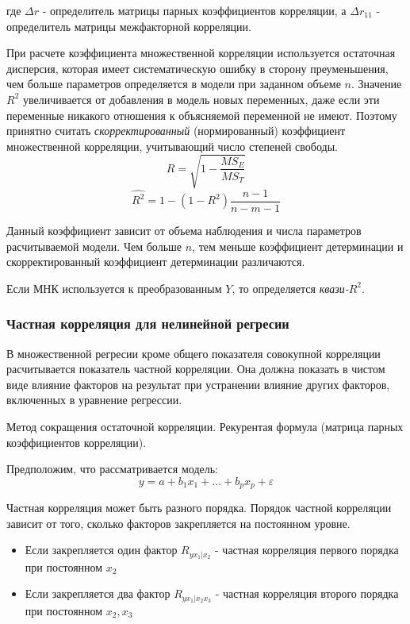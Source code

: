 \documentclass[aps,%
12pt,%
final,%
oneside,
onecolumn,%
musixtex, %
superscriptaddress,%
centertags]{article} %
\begin{document}
где $\Delta r$ - определитель матрицы парных коэффициентов корреляции, а
$\Delta r_{11}$ - определитель матрицы межфакторной корреляции.

При расчете коэффициента множественной корреляции используется остаточная дисперсия, которая имеет систематическую ошибку в сторону преуменьшения, чем больше параметров определяется в модели при заданном объеме $n$. Значение $R^2$ увеличивается от добавления в модель новых переменных, даже если эти переменные никакого отношения к объясняемой переменной не имеют. Поэтому принятно считать \textit{скорректированный} (нормированный) коэффициент множественной корреляции, учитывающий число степеней свободы.
$$ R = \sqrt{1 - \frac{MS_E}{MS_T}}$$
$$ \hat{R^2} = 1 -(1-R^2) \frac{n-1}{n-m-1}$$

Данный коэффициент зависит от объема наблюдения и числа параметров расчитываемой модели. Чем больше $n$, тем меньше коэффициент детерминации и скорректированный коэффициент детерминации различаются.

Если МНК используется к преобразованным $Y$, то определяется \textit{квази-$R^2$}.

\subsubsection{Частная корреляция для нелинейной регресии}

В множественной регресии кроме общего показателя совокупной корреляции расчитывается показатель частной корреляции. Она должна показать в чистом виде влияние факторов на результат при устранении влияние других факторов, включенных в уравнение регрессии.

Метод сокращения остаточной корреляции.
Рекурентая формула (матрица парных коэффициентов корреляции).

Предположим, что рассматривается модель:
$$y=a +b_1x_1 + \ldots + b_px_p + \varepsilon $$

Частная корреляция может быть разного порядка. Порядок частной корреляции зависит от того, сколько факторов закрепляется на постоянном уровне. 
\begin{itemize}
	\item Если закрепляется один фактор $R_{yx_1 | x_2}$ - частная корреляция первого порядка при постоянном $x_2$
	\item Если закрепляется два фактор $R_{yx_1 | x_2x_3}$ - частная корреляция второго порядка при постоянном $x_2,x_3$
\end{itemize}
\end{document}
